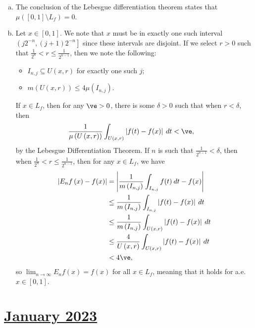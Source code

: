 \documentclass[10pt]{mypackage}
\begin{document}
\begin{enumerate}[(a)]
  \item The conclusion of the Lebesgue differentiation theorem states that $\mu\left( [0,1]\setminus L_f \right) = 0$.
  \item Let $x\in [0,1]$. We note that $x$ must be in exactly one such interval $\left( j2^{-n},\left( j+1 \right)2^{-n} \right]$ since these intervals are disjoint. If we select $r > 0$ such that $\frac{1}{2^{n}} < r \leq \frac{1}{2^{n-1}}$, then we note the following:
    \begin{itemize}
      \item $I_{n,j}\subseteq U\left( x,r \right)$ for exactly one such $j$;
      \item $m\left( U\left( x,r \right) \right) \leq 4\mu\left( I_{n,j} \right)$.
    \end{itemize}
    If $x\in L_f$, then for any $\ve > 0$, there is some $\delta > 0$ such that when $r < \delta$, then
    \begin{align*}
      \frac{1}{\mu\left( U\left( x,r \right) \right)} \int_{U\left( x,r \right)}^{} \left\vert f(t)-f(x) \right\vert\:dt &< \ve,
    \end{align*}
    by the Lebesgue Differentiation Theorem. If $n$ is such that $\frac{1}{2^{n-1}} < \delta$, then when $\frac{1}{2^{n}} < r \leq \frac{1}{2^{n-1}}$, then for any $x\in L_f$, we have
    \begin{align*}
      \left\vert E_nf\left( x \right) - f(x) \right\vert &= \left\vert \frac{1}{m\left( I_{n,j} \right)}\int_{I_{n,j}}^{} f(t)\:dt - f(x) \right\vert\\
                                                         &\leq \frac{1}{m\left( I_{n,j} \right)} \int_{I_{n,j}}^{} \left\vert f(t)-f(x) \right\vert\:dt\\
                                                         &\leq \frac{1}{m\left( I_{n,j} \right)} \int_{U\left( x,r \right)}^{} \left\vert f(t)-f(x) \right\vert\:dt\\
                                                         &\leq \frac{4}{U\left( x,r \right)} \int_{U\left( x,r \right)}^{} \left\vert f(t)-f(x) \right\vert\:dt\\
                                                         &< 4\ve,
    \end{align*}
    so $\lim_{n\rightarrow\infty}E_nf(x) = f(x)$ for all $x\in L_f$, meaning that it holds for a.e. $x\in [0,1]$.
\end{enumerate}
\section{\href{https://math.virginia.edu/graduate/exams/analysis/2023Jan_real.pdf}{January 2023}}%
\end{document}
